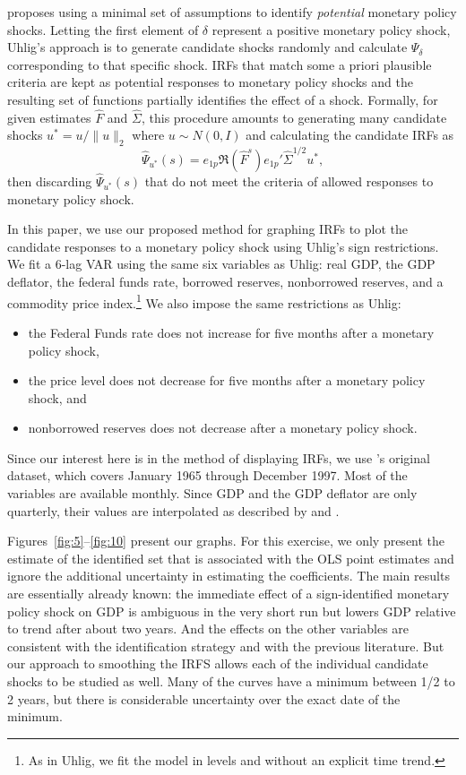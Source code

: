 \documentclass[12pt,fleqn]{article}
\begin{document}
\citet{Uhl:05} proposes using a minimal set of assumptions to identify
\emph{potential} monetary policy shocks. Letting the first element of
$\delta$ represent a positive monetary policy shock, Uhlig's approach
is to generate candidate shocks randomly and calculate $\Psi_\delta$
corresponding to that specific shock. IRFs that match some a priori
plausible criteria are kept as potential responses to monetary policy
shocks and the resulting set of functions partially identifies the
effect of a shock. Formally, for given estimates $\hat F$ and
$\hat \Sigma$, this procedure amounts to generating many candidate
shocks $u^* = u / \| u \|_2$ where $u \sim N(0,I)$ and calculating the
candidate IRFs as
\begin{equation}
  \label{eq:15}
  \hat \Psi_{u^*}(s) =  e_{1p} \Re(\hat F^s) e_{1p}' \hat\Sigma^{1/2} u^*,
\end{equation}
then discarding $\hat\Psi_{u^*}(s)$ that do not meet the criteria of
allowed responses to monetary policy shock.

In this paper, we use our proposed method for graphing IRFs to plot
the candidate responses to a monetary policy shock using Uhlig's sign
restrictions. We fit a 6-lag VAR using the same six variables as
Uhlig: real GDP, the GDP deflator, the federal funds rate, borrowed
reserves, nonborrowed reserves, and a commodity price
index.\footnote{%
  As in Uhlig, we fit the model in levels and without an explicit time
  trend.} %
We also impose the same restrictions as Uhlig:
\begin{itemize}[noitemsep]
\item the Federal Funds rate does not increase for five months after a
  monetary policy shock,
\item the price level does not decrease for five months after a
  monetary policy shock, and
\item nonborrowed reserves does not decrease after a monetary policy
  shock.
\end{itemize}
Since our interest here is in the method of displaying IRFs, we use
\citeauthor{BeM:98}'s original dataset, which covers January 1965
through December 1997.  Most of the variables are available
monthly. Since GDP and the GDP deflator are only quarterly, their
values are interpolated as described by \citet{BGW:97} and
\citet{BeM:98}.

Figures~\ref{fig:5}--\ref{fig:10} present our graphs. For this
exercise, we only present the estimate of the identified set that is
associated with the OLS point estimates and ignore the additional
uncertainty in estimating the coefficients. The main results are
essentially already known: the immediate effect of a sign-identified
monetary policy shock on GDP is ambiguous in the very short run but
lowers GDP relative to trend after about two years. And the effects on
the other variables are consistent with the identification strategy
and with the previous literature. But our approach to smoothing the
IRFS allows each of the individual candidate shocks to be studied as
well. Many of the curves have a minimum between 1/2 to 2 years, but
there is considerable uncertainty over the exact date of the minimum.
\end{document}
